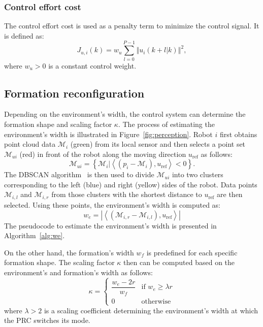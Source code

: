 \subsubsection{Control effort cost}
The control effort cost is used as a penalty term to minimize the control signal. It is defined as:
\begin{equation}
    J_{u,i}(k)=w_u\sum_{l=0}^{P-1}\left\Vert u_i(k+l|k)\right\Vert^2,
\end{equation}
where $w_u>0$ is a constant control weight.

\subsection{Formation reconfiguration}\label{sec:obs_aware}

Depending on the environment's width, the control system can determine the formation shape and scaling factor $\kappa$. The process of estimating the environment's width is illustrated in Figure~\ref{fig:perception}. Robot $i$ first obtains point cloud data $\mathcal{M}_i$ (green) from its local sensor and then selects a point set $\mathcal{M}_{ui}$ (red) in front of the robot along the moving direction $u_\text{ref}$ as follows:
\begin{equation}
    \mathcal{M}_{ui} = \left\{\mathcal{M}_{i}\vert\left\langle\left(p_i-\mathcal{M}_{i}\right),u_\text{ref}\right\rangle<0\right\}.
    \label{eqn:mui}
\end{equation}
The DBSCAN algorithm~\cite{10.5555/3001460.3001507} is then used to divide $\mathcal{M}_{ui}$ into two clusters corresponding to the left (blue) and right (yellow) sides of the robot. Data points $\mathcal{M}_{i,l}$ and $\mathcal{M}_{i,r}$ from those clusters with the shortest distance to $u_\text{ref}$ are then selected. Using these points, the environment's width is computed as:
\begin{equation}
    w_e= \left\vert\left\langle\left(\mathcal{M}_{i,r}-\mathcal{M}_{i,l}\right),u_\text{ref}\right\rangle\right\vert
    \label{eqn:we}
\end{equation}
The pseudocode to estimate the environment's width is presented in Algorithm~\ref{alg:we}. 

On the other hand, the formation's width $w_f$ is predefined for each specific formation shape. The scaling factor $\kappa$ then can be computed based on the environment's and formation's width as follows:
\begin{equation}
    \kappa = 
    \begin{cases} 
        \dfrac{w_e - 2r}{w_f} & \text{if } w_e \geq \lambda r \\
        0 & \text{otherwise}
    \end{cases}
    \label{eqn:kappa}
\end{equation}
where $\lambda > 2$ is a scaling coefficient determining the environment's width at which the PRC switches its mode. 

